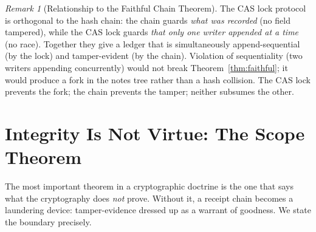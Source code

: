 \documentclass[11pt,oneside]{book}
\theoremstyle{definition}
\theoremstyle{plain}
\theoremstyle{remark}
\newtheorem*{remark}{Remark}
\begin{document}
\begin{remark}[Relationship to the Faithful Chain Theorem]
The CAS lock protocol is orthogonal to the hash chain: the chain guards \emph{what was
recorded} (no field tampered), while the CAS lock guards \emph{that only one writer
appended at a time} (no race). %
Together they give a ledger that is simultaneously
append-sequential (by the lock) and tamper-evident (by the chain). %
Violation of
sequentiality (two writers appending concurrently) would not break Theorem~\ref{thm:faithful};
it would produce a fork in the notes tree rather than a hash collision. %
The CAS lock
prevents the fork; the chain prevents the tamper; neither subsumes the other. %
\end{remark}

\chapter{Integrity Is Not Virtue: The Scope Theorem}
\label{ch:scope}

The most important theorem in a cryptographic doctrine is the one that says what the
cryptography does \emph{not} prove. %
Without it, a receipt chain becomes a laundering device:
tamper-evidence dressed up as a warrant of goodness. %
We state the boundary precisely. %
\end{document}
